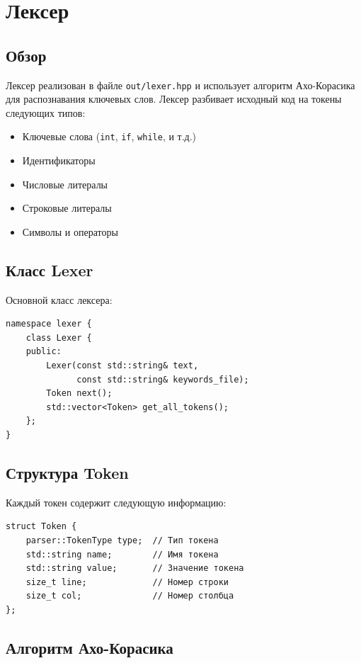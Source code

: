 \documentclass[12pt,a4paper]{article}
\begin{document}
\section{Лексер}

\subsection{Обзор}

Лексер реализован в файле \texttt{out/lexer.hpp} и использует алгоритм Ахо-Корасика для распознавания ключевых слов. Лексер разбивает исходный код на токены следующих типов:

\begin{itemize}
    \item Ключевые слова (\texttt{int}, \texttt{if}, \texttt{while}, и т.д.)
    \item Идентификаторы
    \item Числовые литералы
    \item Строковые литералы
    \item Символы и операторы
\end{itemize}

\subsection{Класс Lexer}

Основной класс лексера:

\begin{lstlisting}
namespace lexer {
    class Lexer {
    public:
        Lexer(const std::string& text, 
              const std::string& keywords_file);
        Token next();
        std::vector<Token> get_all_tokens();
    };
}
\end{lstlisting}

\subsection{Структура Token}

Каждый токен содержит следующую информацию:

\begin{lstlisting}
struct Token {
    parser::TokenType type;  // Тип токена
    std::string name;        // Имя токена
    std::string value;       // Значение токена
    size_t line;             // Номер строки
    size_t col;              // Номер столбца
};
\end{lstlisting}

\subsection{Алгоритм Ахо-Корасика}
\end{document}
